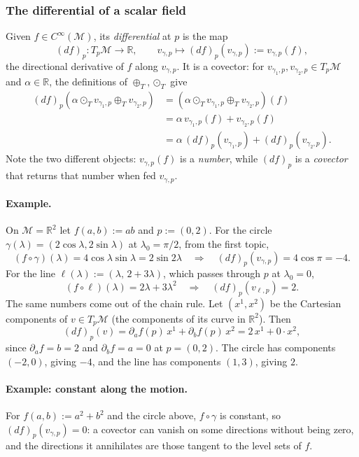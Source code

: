 \documentclass[11pt]{article}
\newcommand{\TpM}{T_p\mathcal M}
\newcommand{\Cinf}{C^\infty(\mathcal M)}
\begin{document}
\subsubsection*{The differential of a scalar field}
Given $f\in\Cinf$, its \emph{differential} at $p$ is the map
\[
(df)_p:\TpM\longrightarrow\mathbb R,\qquad v_{\gamma,p}\longmapsto(df)_p(v_{\gamma,p}):=v_{\gamma,p}(f),
\]
the directional derivative of $f$ along $v_{\gamma,p}$. It is a covector: for $v_{\gamma_1,p},v_{\gamma_2,p}\in\TpM$ and $\alpha\in\mathbb R$, the definitions of $\oplus_T,\odot_T$ give
\begin{align*}
(df)_p(\alpha\odot_Tv_{\gamma_1,p}\oplus_Tv_{\gamma_2,p})&=(\alpha\odot_Tv_{\gamma_1,p}\oplus_Tv_{\gamma_2,p})(f)\\
&=\alpha\,v_{\gamma_1,p}(f)+v_{\gamma_2,p}(f)\\
&=\alpha\,(df)_p(v_{\gamma_1,p})+(df)_p(v_{\gamma_2,p}).
\end{align*}
Note the two different objects: $v_{\gamma,p}(f)$ is a \emph{number}, while $(df)_p$ is a \emph{covector} that returns that number when fed $v_{\gamma,p}$.

\paragraph{Example.} On $\mathcal M=\mathbb R^2$ let $f(a,b):=ab$ and $p:=(0,2)$. For the circle $\gamma(\lambda)=(2\cos\lambda,2\sin\lambda)$ at $\lambda_0=\pi/2$, from the first topic,
\[
(f\circ\gamma)(\lambda)=4\cos\lambda\sin\lambda=2\sin2\lambda\quad\Longrightarrow\quad(df)_p(v_{\gamma,p})=4\cos\pi=-4.
\]
For the line $\ell(\lambda):=(\lambda,\,2+3\lambda)$, which passes through $p$ at $\lambda_0=0$,
\[
(f\circ\ell)(\lambda)=2\lambda+3\lambda^2\quad\Longrightarrow\quad(df)_p(v_{\ell,p})=2.
\]
The same numbers come out of the chain rule. Let $(x^1,x^2)$ be the Cartesian components of $v\in\TpM$ (the components of its curve in $\mathbb R^2$). Then
\[
(df)_p(v)=\partial_af(p)\,x^1+\partial_bf(p)\,x^2=2\,x^1+0\cdot x^2,
\]
since $\partial_af=b=2$ and $\partial_bf=a=0$ at $p=(0,2)$. The circle has components $(-2,0)$, giving $-4$, and the line has components $(1,3)$, giving $2$.

\paragraph{Example: constant along the motion.} For $f(a,b):=a^2+b^2$ and the circle above, $f\circ\gamma$ is constant, so $(df)_p(v_{\gamma,p})=0$: a covector can vanish on some directions without being zero, and the directions it annihilates are those tangent to the level sets of $f$.
\end{document}
